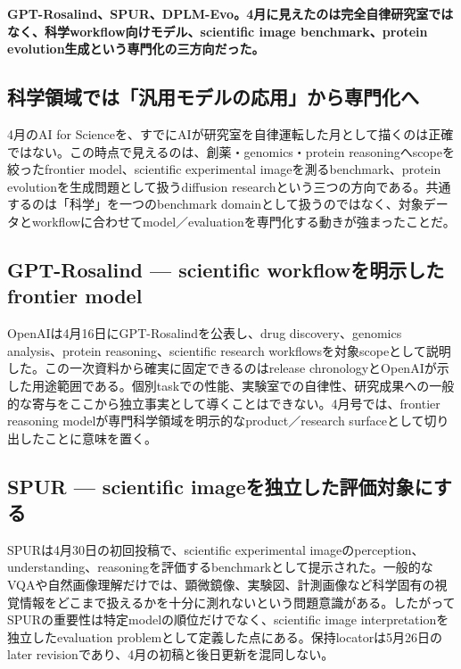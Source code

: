 \noindent\textbf{GPT-Rosalind、SPUR、DPLM-Evo。4月に見えたのは完全自律研究室ではなく、科学workflow向けモデル、scientific image benchmark、protein evolution生成という専門化の三方向だった。}\autocite{src-078f0d540d88,src-7ae707d75c4b,src-f0bb84fcd319}

\subsection{科学領域では「汎用モデルの応用」から専門化へ}

4月のAI for Scienceを、すでにAIが研究室を自律運転した月として描くのは正確ではない。この時点で見えるのは、創薬・genomics・protein reasoningへscopeを絞ったfrontier model、scientific experimental imageを測るbenchmark、protein evolutionを生成問題として扱うdiffusion researchという三つの方向である。共通するのは「科学」を一つのbenchmark domainとして扱うのではなく、対象データとworkflowに合わせてmodel／evaluationを専門化する動きが強まったことだ。\autocite{src-078f0d540d88,src-7ae707d75c4b,src-f0bb84fcd319}


\subsection{GPT-Rosalind — scientific workflowを明示したfrontier model}

OpenAIは4月16日にGPT-Rosalindを公表し、drug discovery、genomics analysis、protein reasoning、scientific research workflowsを対象scopeとして説明した。この一次資料から確実に固定できるのはrelease chronologyとOpenAIが示した用途範囲である。個別taskでの性能、実験室での自律性、研究成果への一般的な寄与をここから独立事実として導くことはできない。4月号では、frontier reasoning modelが専門科学領域を明示的なproduct／research surfaceとして切り出したことに意味を置く。\autocite{src-078f0d540d88}


\subsection{SPUR — scientific imageを独立した評価対象にする}

SPURは4月30日の初回投稿で、scientific experimental imageのperception、understanding、reasoningを評価するbenchmarkとして提示された。一般的なVQAや自然画像理解だけでは、顕微鏡像、実験図、計測画像など科学固有の視覚情報をどこまで扱えるかを十分に測れないという問題意識がある。したがってSPURの重要性は特定modelの順位だけでなく、scientific image interpretationを独立したevaluation problemとして定義した点にある。保持locatorは5月26日のlater revisionであり、4月の初稿と後日更新を混同しない。\autocite{src-7ae707d75c4b}


